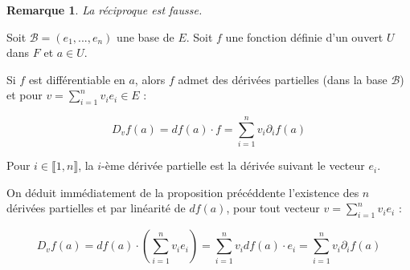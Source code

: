 \documentclass[a4paper,12pt]{book}
\newcommand{\Prop}[2]{\begin{tcolorbox}[sharp corners, colback=white,colframe=red!90!black!75, title=Proposition : #1]#2\end{tcolorbox}}
\newcommand{\Pre}[1]{\begin{tcolorbox}[sharp corners, colback=white,colframe=green!60!green!30!black!75, title=Preuve]#1\end{tcolorbox}}
\newtheorem{Rem}{Remarque}[section]
\begin{document}
\begin{Rem}
La réciproque est fausse.
\end{Rem}
\Prop{Corollaire}{Soit $\mathcal{B}=(e_1,..., e_n)$ une base de $E$. Soit $f$ une fonction définie d'un ouvert $U$ dans $F$ et $a\in U$.
\par Si $f$ est différentiable en $a$, alors $f$ admet des dérivées partielles (dans la base $\mathcal{B}$) et pour $v=\sum\limits_{i=1}^nv_ie_i\in E$ :
\par $$D_vf(a) = df(a)\cdot f = \sum\limits_{i=1}^nv_i\partial_if(a)$$}
\Pre{Pour $i\in\llbracket 1, n\rrbracket$, la $i$-ème dérivée partielle est la dérivée suivant le vecteur $e_i$.
\par On déduit immédiatement de la proposition précéddente l'existence des $n$ dérivées partielles et par linéarité de $df(a)$, pour tout vecteur $v=\sum\limits_{i=1}^nv_ie_i$ :
\par $$D_vf(a) = df(a)\cdot\left(\sum\limits_{i=1}^nv_ie_i\right) = \sum\limits_{i=1}^nv_idf(a)\cdot e_i=\sum\limits_{i=1}^nv_i\partial_if(a)$$}
\end{document}
